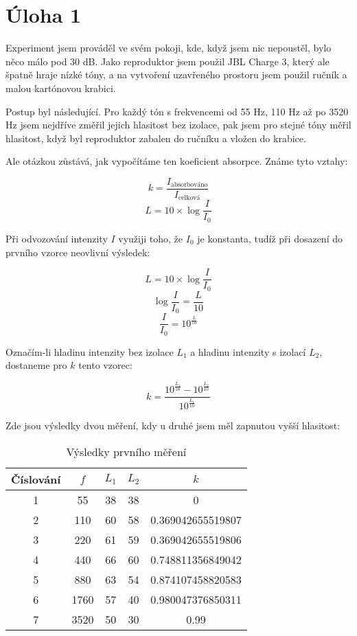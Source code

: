 \documentclass{fkssolpub}
\author{Ondřej Sedláček}
\begin{document}
 

\section{Úloha 1}

Experiment jsem prováděl ve svém pokoji, kde, když jsem nic nepoustěl, 
bylo něco málo pod 30 dB. Jako reproduktor jsem použil JBL Charge 3,
který ale špatně hraje nízké tóny, a na vytvoření uzavřeného prostoru
jsem použil ručník a malou kartónovou krabici.

Postup byl následující. Pro každý tón s frekvencemi od 55 Hz, 110 Hz až
po 3520 Hz jsem nejdříve změřil jejich hlasitost bez izolace, pak jsem
pro stejné tóny měřil hlasitost, když byl reproduktor zabalen do ručníku
a vložen do krabice. 

Ale otázkou zůstává, jak vypočítáme ten koeficient absorpce. Známe tyto
vztahy:

\[
  k = \frac{I_{\text{absorbováno}}}{I_{\text{celková}}}
\]
\[
  L = 10 \times \log{\frac{I}{I_0}}
\]

Při odvozování intenzity $I$ využiji toho, že $I_0$ je konstanta,
tudíž při dosazení do prvního vzorce neovlivní výsledek:

\[
  L = 10 \times \log{\frac{I}{I_0}}
\]
\[
  \log{\frac{I}{I_0}} = \frac{L}{10}
\]
\[
  \frac{I}{I_0} = 10^{\frac{L}{10}}
\]

Označím-li hladinu intenzity bez izolace $L_1$ a hladinu intenzity 
s izolací $L_2$, dostaneme pro $k$ tento vzorec:

\[
  k = \frac{10^{\frac{L_1}{10}} - 10^{\frac{L_2}{10}}}{10^{\frac{L_1}{10}}}
\]

Zde jsou výsledky dvou měření, kdy u druhé jsem měl zapnutou vyšší
hlasitost:

\begin{table}[h!]
  \caption{Výsledky prvního měření}
  \label{tab:1}
  \begin{center}
    \begin{tabular}{|c|c|c|c|c|}
      \hline
      Číslování & $f$ & $L_1$ & $L_2$ & $k$ \\
      \hline
      1 & 55 & 38 & 38 & 0 \\
      2 & 110 & 60 & 58 & 0.369042655519807 \\
      3 & 220 & 61 & 59 & 0.369042655519806 \\
      4 & 440 & 66 & 60 & 0.748811356849042 \\
      5 & 880 & 63 & 54 & 0.874107458820583 \\
      6 & 1760 & 57 & 40 & 0.980047376850311 \\
      7 & 3520 & 50 & 30 & 0.99 \\
      \hline
    \end{tabular}
  \end{center}
\end{table}
\end{document}
